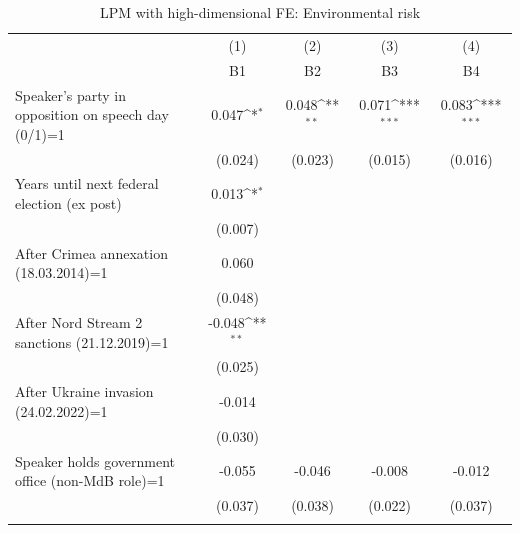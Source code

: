 \begin{table}[htbp]\centering
\def\sym#1{\ifmmode^{#1}\else\(^{#1}\)\fi}
\caption{LPM with high-dimensional FE: Environmental risk}
\begin{tabular}{l*{4}{c}}
\toprule
                    &\multicolumn{1}{c}{(1)}&\multicolumn{1}{c}{(2)}&\multicolumn{1}{c}{(3)}&\multicolumn{1}{c}{(4)}\\
                    &\multicolumn{1}{c}{B1}&\multicolumn{1}{c}{B2}&\multicolumn{1}{c}{B3}&\multicolumn{1}{c}{B4}\\
\midrule
Speaker's party in opposition on speech day (0/1)=1&       0.047\sym{*}  &       0.048\sym{**} &       0.071\sym{***}&       0.083\sym{***}\\
                    &     (0.024)         &     (0.023)         &     (0.015)         &     (0.016)         \\
\addlinespace
Years until next federal election (ex post)&       0.013\sym{*}  &                     &                     &                     \\
                    &     (0.007)         &                     &                     &                     \\
\addlinespace
After Crimea annexation (18.03.2014)=1&       0.060         &                     &                     &                     \\
                    &     (0.048)         &                     &                     &                     \\
\addlinespace
After Nord Stream 2 sanctions (21.12.2019)=1&      -0.048\sym{**} &                     &                     &                     \\
                    &     (0.025)         &                     &                     &                     \\
\addlinespace
After Ukraine invasion (24.02.2022)=1&      -0.014         &                     &                     &                     \\
                    &     (0.030)         &                     &                     &                     \\
\addlinespace
Speaker holds government office (non-MdB role)=1&      -0.055         &      -0.046         &      -0.008         &      -0.012         \\
                    &     (0.037)         &     (0.038)         &     (0.022)         &     (0.037)         \\
\addlinespace

\end{tabular}
\end{table}
